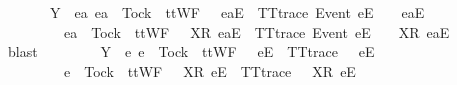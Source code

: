 \begin{isabellebody}
\ \ \ \ \ \ {\isasymsubseteq}\ Y\ {\isasyminter}\ {\isacharbraceleft}ea{\isachardot}\ ea\ {\isasymnoteq}\ Tock\ {\isasymand}\ ttWF\ {\isacharparenleft}{\isasymsigma}{\isacharprime}\ {\isacharat}\ {\isacharbrackleft}{\isacharbrackleft}ea{\isacharbrackright}\isactrlsub E{\isacharbrackright}{\isacharparenright}\ {\isasymand}\ TT{}{\isacharunderscore}trace\ {\isacharparenleft}{\isacharbrackleft}Event\ e{\isacharbrackright}\isactrlsub E\ {\isacharhash}\ {\isasymsigma}{\isacharprime}\ {\isacharat}\ {\isacharbrackleft}{\isacharbrackleft}ea{\isacharbrackright}\isactrlsub E{\isacharbrackright}{\isacharparenright}\isanewline
\ \ \ \ \ \ \ \ {\isasymor}\ ea\ {\isacharequal}\ Tock\ {\isasymand}\ ttWF\ {\isacharparenleft}{\isasymsigma}{\isacharprime}\ {\isacharat}\ {\isacharbrackleft}{\isacharbrackleft}X{\isacharbrackright}\isactrlsub R{\isacharcomma}\ {\isacharbrackleft}ea{\isacharbrackright}\isactrlsub E{\isacharbrackright}{\isacharparenright}\ {\isasymand}\ TT{}{\isacharunderscore}trace\ {\isacharparenleft}{\isacharbrackleft}Event\ e{\isacharbrackright}\isactrlsub E\ {\isacharhash}\ {\isasymsigma}{\isacharprime}\ {\isacharat}\ {\isacharbrackleft}{\isacharbrackleft}X{\isacharbrackright}\isactrlsub R{\isacharcomma}\ {\isacharbrackleft}ea{\isacharbrackright}\isactrlsub E{\isacharbrackright}{\isacharparenright}{\isacharbraceright}{\isachardoublequoteclose}\isanewline
\ \ \ \ \ \ \isamarkupfalse%
\ blast\isanewline
\ \ \ \ \isamarkupfalse%
\ \isamarkupfalse%
\ {}{\isacharcolon}\ {\isachardoublequoteopen}Y\ {\isasyminter}\ {\isacharbraceleft}e{\isachardot}\ e\ {\isasymnoteq}\ Tock\ {\isasymand}\ ttWF\ {\isacharparenleft}{\isasymsigma}{\isacharprime}\ {\isacharat}\ {\isacharbrackleft}{\isacharbrackleft}e{\isacharbrackright}\isactrlsub E{\isacharbrackright}{\isacharparenright}\ {\isasymand}\ TT{}{\isacharunderscore}trace\ {\isacharparenleft}{\isasymsigma}{\isacharprime}\ {\isacharat}\ {\isacharbrackleft}{\isacharbrackleft}e{\isacharbrackright}\isactrlsub E{\isacharbrackright}{\isacharparenright}\isanewline
\ \ \ \ \ \ \ \ {\isasymor}\ e\ {\isacharequal}\ Tock\ {\isasymand}\ ttWF\ {\isacharparenleft}{\isasymsigma}{\isacharprime}\ {\isacharat}\ {\isacharbrackleft}{\isacharbrackleft}X{\isacharbrackright}\isactrlsub R{\isacharcomma}\ {\isacharbrackleft}e{\isacharbrackright}\isactrlsub E{\isacharbrackright}{\isacharparenright}\ {\isasymand}\ TT{}{\isacharunderscore}trace\ {\isacharparenleft}{\isasymsigma}{\isacharprime}\ {\isacharat}\ {\isacharbrackleft}{\isacharbrackleft}X{\isacharbrackright}\isactrlsub R{\isacharcomma}\ {\isacharbrackleft}e{\isacharbrackright}\isactrlsub E{\isacharbrackright}{\isacharparenright}{\isacharbraceright}\ {\isacharequal}\ {\isacharbraceleft}{\isacharbraceright}{\isachardoublequoteclose}\isanewline

\end{isabellebody}
